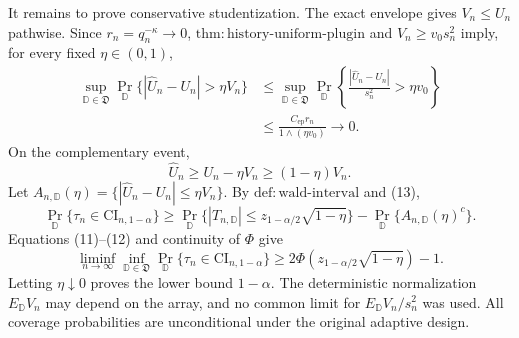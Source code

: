 It remains to prove conservative studentization. The exact envelope gives \(V_n\le U_n\) pathwise. Since \(r_n=q_n^{-\kappa}\to0\), \(\mathrm{thm:history\text{-}uniform\text{-}plugin}\) and \(V_n\ge v_0s_n^2\) imply, for every fixed \(\eta\in(0,1)\),
\[
\begin{aligned}
\sup_{\mathbb D\in\mathfrak D}
\Pr_{\mathbb D}\{|\widehat U_n-U_n|>\eta V_n\}
&\le\sup_{\mathbb D\in\mathfrak D}
\Pr_{\mathbb D}\left\{\frac{|\widehat U_n-U_n|}{s_n^2}>\eta v_0\right\}\\
&\le\frac{C_{\mathrm{ep}}r_n}{1\wedge(\eta v_0)}\longrightarrow0.
\end{aligned}
\tag{12}
\]
On the complementary event,
\[
\widehat U_n\ge U_n-\eta V_n\ge(1-\eta)V_n.
\tag{13}
\]
Let \(A_{n,\mathbb D}(\eta)=\{|\widehat U_n-U_n|\le\eta V_n\}\). By \(\mathrm{def:wald\text{-}interval}\) and (13),
\[
\Pr_{\mathbb D}\{\tau_n\in\mathrm{CI}_{n,1-\alpha}\}
\ge\Pr_{\mathbb D}\{|T_{n,\mathbb D}|\le z_{1-\alpha/2}\sqrt{1-\eta}\}
-\Pr_{\mathbb D}\{A_{n,\mathbb D}(\eta)^c\}.
\]
Equations (11)--(12) and continuity of \(\Phi\) give
\[
\liminf_{n\to\infty}\inf_{\mathbb D\in\mathfrak D}
\Pr_{\mathbb D}\{\tau_n\in\mathrm{CI}_{n,1-\alpha}\}
\ge2\Phi\!\left(z_{1-\alpha/2}\sqrt{1-\eta}\right)-1.
\tag{14}
\]
Letting \(\eta\downarrow0\) proves the lower bound \(1-\alpha\). The deterministic normalization \(E_{\mathbb D}V_n\) may depend on the array, and no common limit for \(E_{\mathbb D}V_n/s_n^2\) was used. All coverage probabilities are unconditional under the original adaptive design.